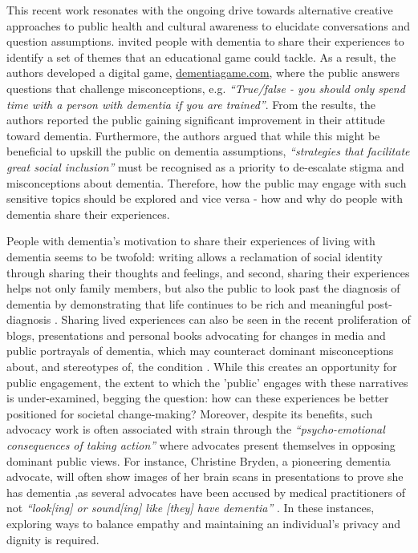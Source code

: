 This recent work resonates with the ongoing drive towards alternative creative approaches to public health and cultural awareness to elucidate conversations and question assumptions. \cite{carter2021effectiveness} invited people with dementia to share their experiences to identify a set of themes that an educational game could tackle. As a result, the authors developed a digital game, \href{https://www.dementiagame.com}{dementiagame.com}, where the public answers questions that challenge misconceptions, e.g. \textit{``True/false - you should only spend time with a person with dementia if you are trained''}. From the results, the authors reported the public gaining significant improvement in their attitude toward dementia. Furthermore, the authors argued that while this might be beneficial to upskill the public on dementia assumptions, \textit{``strategies that facilitate great social inclusion''} must be recognised as a priority to de-escalate stigma and misconceptions about dementia. Therefore, how the public may engage with such sensitive topics should be explored and vice versa - how and why do people with dementia share their experiences.

People with dementia's motivation to share their experiences of living with dementia seems to be twofold: writing allows a reclamation of social identity through sharing their thoughts and feelings, and second, sharing their experiences helps not only family members, but also the public to look past the diagnosis of dementia by demonstrating that life continues to be rich and meaningful post-diagnosis \citep{ryan_dementia_2009}. Sharing lived experiences can also be seen in the recent proliferation of blogs, presentations and personal books advocating for changes in media and public portrayals of dementia, which may counteract dominant misconceptions about, and stereotypes of, the condition \citep{christine_bryden_dancing_2005,bryden_challenging_2020}. While this creates an opportunity for public engagement, the extent to which the 'public' engages with these narratives is under-examined, begging the question: how can these experiences be better positioned for societal change-making? Moreover, despite its benefits, such advocacy work is often associated with strain through the \textit{``psycho-emotional consequences of taking action'' }\citep{bartlett_citizenship_2014} where advocates present themselves in opposing dominant public views. For instance, Christine Bryden, a pioneering dementia advocate, will often show images of her brain scans in presentations to prove she has dementia ,as several advocates have been accused by medical practitioners of not \textit{``look[ing] or sound[ing] like [they] have dementia''} \citep{swaffer_but_2016}. In these instances, exploring ways to balance empathy and maintaining an individual's privacy and dignity is required.

